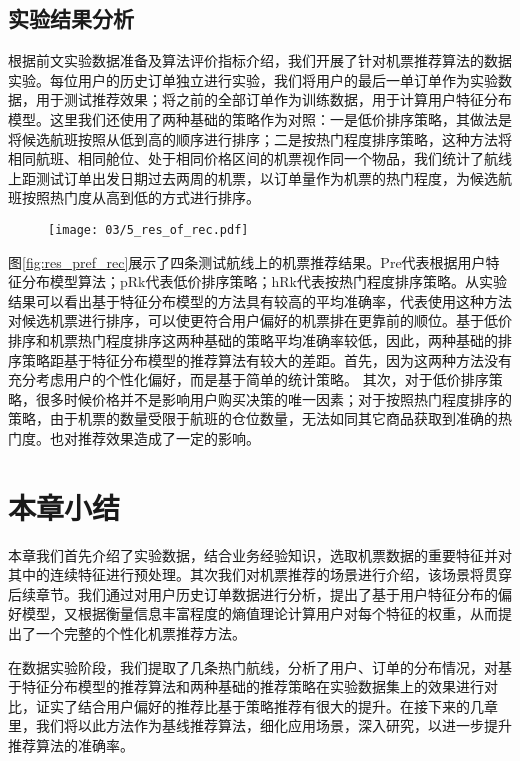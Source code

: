 \subsection{实验结果分析}

根据前文实验数据准备及算法评价指标介绍，我们开展了针对机票推荐算法的数据实验。每位用户的历史订单独立进行实验，我们将用户的最后一单订单作为实验数据，用于测试推荐效果；将之前的全部订单作为训练数据，用于计算用户特征分布模型。这里我们还使用了两种基础的策略作为对照：一是低价排序策略，其做法是将候选航班按照从低到高的顺序进行排序；二是按热门程度排序策略，这种方法将相同航班、相同舱位、处于相同价格区间的机票视作同一个物品，我们统计了航线上距测试订单出发日期过去两周的机票，以订单量作为机票的热门程度，为候选航班按照热门度从高到低的方式进行排序。

\begin{figure}
 \centering
 \texttt{[image: 03/5\_res\_of\_rec.pdf]}
\end{figure}

图\ref{fig:res_pref_rec}展示了四条测试航线上的机票推荐结果。Pre代表根据用户特征分布模型算法；pRk代表低价排序策略；hRk代表按热门程度排序策略。从实验结果可以看出基于特征分布模型的方法具有较高的平均准确率，代表使用这种方法对候选机票进行排序，可以使更符合用户偏好的机票排在更靠前的顺位。基于低价排序和机票热门程度排序这两种基础的策略平均准确率较低，因此，两种基础的排序策略距基于特征分布模型的推荐算法有较大的差距。首先，因为这两种方法没有充分考虑用户的个性化偏好，而是基于简单的统计策略。
其次，对于低价排序策略，很多时候价格并不是影响用户购买决策的唯一因素；对于按照热门程度排序的策略，由于机票的数量受限于航班的仓位数量，无法如同其它商品获取到准确的热门度。也对推荐效果造成了一定的影响。


\section{本章小结}
本章我们首先介绍了实验数据，结合业务经验知识，选取机票数据的重要特征并对其中的连续特征进行预处理。其次我们对机票推荐的场景进行介绍，该场景将贯穿后续章节。我们通过对用户历史订单数据进行分析，提出了基于用户特征分布的偏好模型，又根据衡量信息丰富程度的熵值理论计算用户对每个特征的权重，从而提出了一个完整的个性化机票推荐方法。

在数据实验阶段，我们提取了几条热门航线，分析了用户、订单的分布情况，对基于特征分布模型的推荐算法和两种基础的推荐策略在实验数据集上的效果进行对比，证实了结合用户偏好的推荐比基于策略推荐有很大的提升。在接下来的几章里，我们将以此方法作为基线推荐算法，细化应用场景，深入研究，以进一步提升推荐算法的准确率。